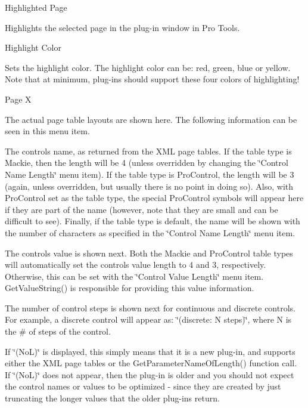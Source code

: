 \begin{DoxyItemize}
\item  Highlighted Page 

Highlights the selected page in the plug-\/in window in Pro Tools.


\item  Highlight Color 

Sets the highlight color. The highlight color can be\+: red, green, blue or yellow. Note that at minimum, plug-\/in\textquotesingle{}s should support these four colors of highlighting! 


\item  Page X 

The actual page table layouts are shown here. The following information can be seen in this menu item. 
\begin{DoxyItemize}
\item The control\textquotesingle{}s name, as returned from the X\+ML page tables. If the table type is Mackie, then the length will be 4 (unless overridden by changing the \char`\"{}\+Control Name Length\char`\"{} menu item). If the table type is Pro\+Control, the length will be 3 (again, unless overridden, but usually there is no point in doing so). Also, with Pro\+Control set as the table type, the special Pro\+Control symbols will appear here if they are part of the name (however, note that they are small and can be difficult to see). Finally, if the table type is default, the name will be shown with the number of characters as specified in the \char`\"{}\+Control Name Length\char`\"{} menu item.  
\item The control\textquotesingle{}s value is shown next. Both the Mackie and Pro\+Control table types will automatically set the control\textquotesingle{}s value length to 4 and 3, respectively. Otherwise, this can be set with the \char`\"{}\+Control Value Length\char`\"{} menu item. Get\+Value\+String() is responsible for providing this \textquotesingle{}value\textquotesingle{} information. 
\item The number of control steps is shown next for continuous and discrete controls. For example, a discrete control will appear as\+: \char`\"{}(discrete\+: N steps)\char`\"{}, where N is the \# of steps of the control. 
\item If \char`\"{}(\+No\+L)\char`\"{} is displayed, this simply means that it is a new plug-\/in, and supports either the X\+ML page tables or the Get\+Parameter\+Name\+Of\+Length() function call. If \char`\"{}(\+No\+L)\char`\"{} does not appear, then the plug-\/in is older and you should not expect the control names or values to be optimized -\/ since they are created by just truncating the longer values that the older plug-\/ins return. 

\end{DoxyItemize}
\end{DoxyItemize}
